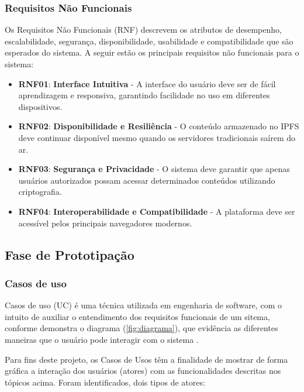         \subsubsection{Requisitos Não Funcionais}
        Os Requisitos Não Funcionais (RNF) descrevem os atributos de desempenho, escalabilidade, segurança, disponibilidade, usabilidade e compatibilidade que são esperados do sistema. A seguir estão os principais requisitos não funcionais para o sistema:

        \begin{itemize}
            \item \textbf{RNF01}: \textbf{Interface Intuitiva} - A interface do usuário deve ser de fácil aprendizagem e responsiva, garantindo facilidade no uso em diferentes dispositivos.
            \item \textbf{RNF02}: \textbf{Disponibilidade e Resiliência} - O conteúdo armazenado no IPFS deve continuar disponível mesmo quando os servidores tradicionais saírem do ar.
            \item \textbf{RNF03}: \textbf{Segurança e Privacidade} - O sistema deve garantir que apenas usuários autorizados possam acessar determinados conteúdos utilizando criptografia.
            \item \textbf{RNF04}: \textbf{Interoperabilidade e Compatibilidade} - A plataforma deve ser acessível pelos principais navegadores modernos.
        \end{itemize}

    \subsection{Fase de Prototipação}

        \subsubsection{Casos de uso}
        Casos de uso (UC) é uma técnica utilizada em engenharia de software, com o intuito de auxiliar o entendimento dos requisitos funcionais de um sitema, conforme demonstra o diagrama (\ref{fig:diagrama}), que evidência as diferentes maneiras que o usuário pode interagir com o sistema \cite{lucidchart2025}.

        Para fins deste projeto, os Casos de Usos têm a finalidade de mostrar de forma gráfica a interação dos usuários (atores) com as funcionalidades descritas nos tópicos acima. Foram identificados, dois tipos de atores:
        
